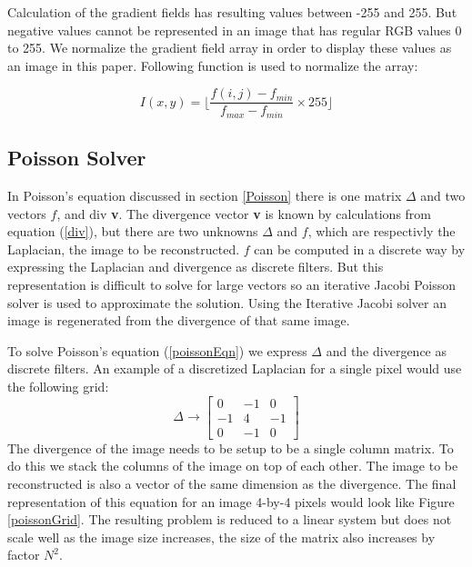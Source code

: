 \documentclass[10pt,twopage]{acmsiggraph}
\begin{document}
Calculation of the gradient fields has resulting values between -255 and 255. But negative values cannot be represented in an image that has regular RGB values 0 to 255.  We normalize the gradient field array in order to display these values as an image in this paper. Following function is used to normalize the array:

\begin{equation}
\label{normalize}
\ensuremath{I(x,y) = \lfloor\frac{f(i,j) - f_{min}}{f_{max} - f_{min}} \times 255 \rfloor}
\end{equation}

\subsection{Poisson Solver}

In Poisson's equation discussed in section \ref{Poisson} there is one matrix \ensuremath{\Delta} and two vectors $f$, and div {\bf v}. The divergence vector {\bf v} is known by calculations from equation (\ref{div}), but there are two unknowns \ensuremath{\Delta} and $f$, which are respectivly the Laplacian, the image to be reconstructed. $f$ can be computed in a discrete way by expressing the Laplacian and divergence as discrete filters.  But this representation is difficult to solve for large vectors so an iterative Jacobi Poisson solver is used to approximate the solution. Using the Iterative Jacobi solver an image is regenerated from the divergence of that same image. 

To solve Poisson's equation (\ref{poissonEqn}) we express \ensuremath{\Delta} and the divergence as discrete filters. An example of a discretized Laplacian for a single pixel would use the following grid:
\begin{equation}
\label{lapDes}
\Delta \rightarrow  
\left[\begin{array}{ccc}
0 & -1 & 0 \\
-1 & 4 & -1 \\
0 & -1 & 0 \end{array}\right]
\end{equation}
The divergence of the image needs to be setup to be a single column matrix. To do this we stack the columns of the image on top of each other. The image to be reconstructed is also a vector of the same dimension as the divergence. The final representation of this equation for an image 4-by-4 pixels would look like Figure \ref{poissonGrid}. The resulting problem is reduced to a linear system but does not scale well as the image size increases, the size of the matrix also increases by factor $N^2$. 
\end{document}
